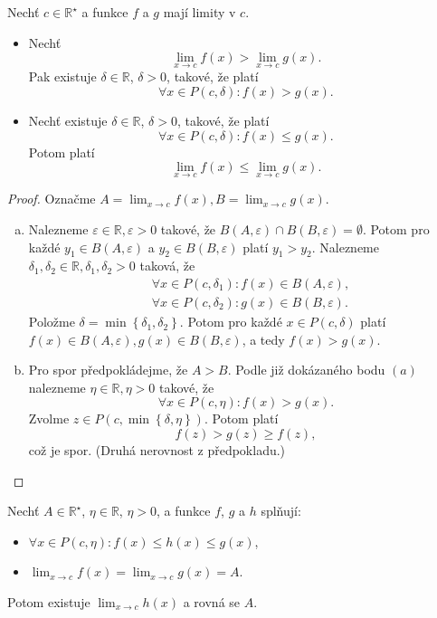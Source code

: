 \begin{veta}\label{veta3.5} %
Nechť $c \in \mathbb{R}^\star$ a funkce $f$ a $g$ mají limity v $c$.
\begin{itemize}
  \item[(a)] Nechť
  \[
  \lim_{x \to c} f(x) > \lim_{x \to c} g(x).
  \]
  Pak existuje $\delta \in \mathbb{R}$, $\delta > 0$, takové, že platí
  \[
  \forall x \in P(c,\delta) : f(x) > g(x).
  \]
  \item[(b)] Nechť existuje $\delta \in \mathbb{R}$, $\delta > 0$, takové, že platí
  \[
  \forall x \in P(c,\delta) : f(x) \le g(x).
  \]
  Potom platí
  \[
  \lim_{x \to c} f(x) \le \lim_{x \to c} g(x).
  \]
\end{itemize}
\end{veta}

\begin{proof}
	Označme $A = \lim_{x\to c} f(x), B = \lim_{x\to c} g(x)$.
	\begin{enumerate}[(a)]
		\item Nalezneme $\varepsilon \in \mathbb R , \varepsilon > 0$
		takové, že $B(A,\varepsilon) \cap B(B,\varepsilon) = \emptyset.$ Potom pro každé $y_1 \in B(A,\varepsilon)$
		a $y_2\in B(B,\varepsilon)$ platí $y_1 > y_2$. Nalezneme $\delta_1, \delta_2 \in \mathbb R , \delta_1, \delta_2 > 0$
		taková, že
		\begin{align*}
			& \forall x \in P(c,\delta_1):f(x)\in B(A,\varepsilon), \\
			& \forall x \in P(c,\delta_2):g(x)\in B(B,\varepsilon).
\end{align*}
    Položme $\delta = \min \left \{ \delta_1, \delta_2 \right \} $. Potom pro každé $x \in P(c,\delta)$
    platí $f(x)\in B(A,\varepsilon),g(x)\in B(B,\varepsilon)$, a tedy $f(x) > g(x)$.
    \item Pro spor předpokládejme, že $A > B$. Podle již dokázaného bodu $(a)$ nalezneme
    $\eta \in \mathbb R , \eta > 0$ takové, že
    $$
        \forall x \in P(c,\eta): f(x) > g(x).
    $$
    Zvolme $z \in P(c, \min \left \{ \delta, \eta \right \} )$. Potom platí
    $$
        f(z) > g(z) \geq f(z),
    $$
    což je spor. (Druhá nerovnost z předpokladu.) \qedhere
\end{enumerate}
\end{proof}

\begin{veta} %
Nechť $A \in \mathbb{R}^\star$, $\eta \in \mathbb{R}$, $\eta > 0$, a funkce
$f$, $g$ a $h$ splňují:
\begin{itemize}
  \item $\forall x \in P(c,\eta) : f(x) \le h(x) \le g(x)$,
  \item $\lim_{x \to c} f(x) = \lim_{x \to c} g(x) = A$.
\end{itemize}
Potom existuje $\lim_{x \to c} h(x)$ a rovná se $A$.
\end{veta}

